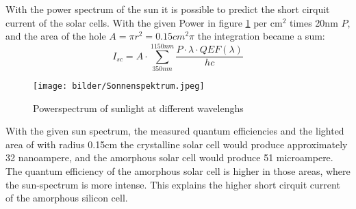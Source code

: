 With the power spectrum of the sun it is possible to predict the short cirquit current of the solar cells.
With the given Power in figure \ref{fig:sunspectrum} per cm$^2$ times 20nm $P$, and the area of the hole $A = \pi r^2 = 0.15cm^2 \pi$ the integration became a sum:
\begin{equation}
  I_{sc} = A  \cdot \sum_{350nm}^{1150nm} \frac{P \cdot \lambda \cdot QEF(\lambda)}{hc}
\end{equation}
\begin{figure}[h]
  \centering
  \texttt{[image: bilder/Sonnenspektrum.jpeg]}
  \caption{Powerspectrum of sunlight at different wavelenghs}
  \label{fig:sunspectrum}
\end{figure}
With the given sun spectrum, the measured quantum efficiencies and the lighted area of with radius 0.15cm the crystalline solar cell would produce approximately 32 nanoampere, and the amorphous solar cell would produce 51 microampere.
The quantum efficiency of the amorphous solar cell is higher in those areas, where the sun-spectrum is more intense. This explains the higher short cirquit current of the amorphous silicon cell.

